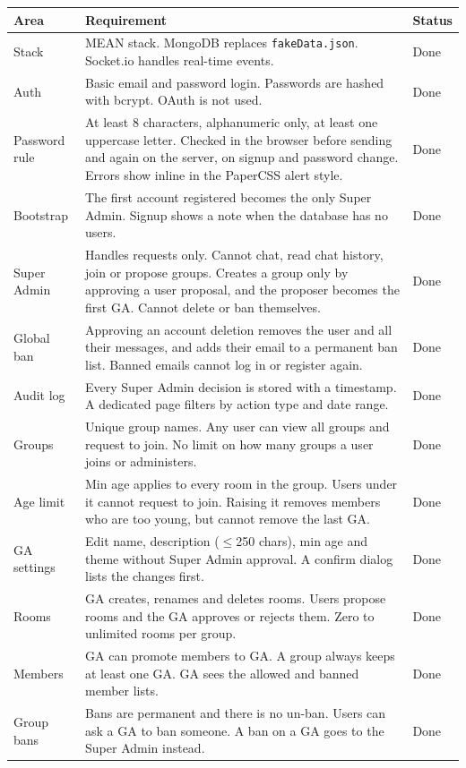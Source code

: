 \documentclass[10pt,a4paper]{article}
\newcommand{\ep}[1]{\texttt{\small #1}}
\begin{document}
\begin{longtable}{L{2.6cm} L{11.2cm} L{1.9cm}}
\toprule
\textbf{Area} & \textbf{Requirement} & \textbf{Status}\\
\midrule
\endhead
Stack & MEAN stack. MongoDB replaces \ep{fakeData.json}. Socket.io handles real-time events. & Done\\
Auth & Basic email and password login. Passwords are hashed with bcrypt. OAuth is not used. & Done\\
Password rule & At least 8 characters, alphanumeric only, at least one uppercase letter. Checked in the browser before sending and again on the server, on signup and password change. Errors show inline in the PaperCSS alert style. & Done\\
Bootstrap & The first account registered becomes the only Super Admin. Signup shows a note when the database has no users. & Done\\
Super Admin & Handles requests only. Cannot chat, read chat history, join or propose groups. Creates a group only by approving a user proposal, and the proposer becomes the first GA. Cannot delete or ban themselves. & Done\\
Global ban & Approving an account deletion removes the user and all their messages, and adds their email to a permanent ban list. Banned emails cannot log in or register again. & Done\\
Audit log & Every Super Admin decision is stored with a timestamp. A dedicated page filters by action type and date range. & Done\\
Groups & Unique group names. Any user can view all groups and request to join. No limit on how many groups a user joins or administers. & Done\\
Age limit & Min age applies to every room in the group. Users under it cannot request to join. Raising it removes members who are too young, but cannot remove the last GA. & Done\\
GA settings & Edit name, description ($\le$250 chars), min age and theme without Super Admin approval. A confirm dialog lists the changes first. & Done\\
Rooms & GA creates, renames and deletes rooms. Users propose rooms and the GA approves or rejects them. Zero to unlimited rooms per group. & Done\\
Members & GA can promote members to GA. A group always keeps at least one GA. GA sees the allowed and banned member lists. & Done\\
Group bans & Bans are permanent and there is no un-ban. Users can ask a GA to ban someone. A ban on a GA goes to the Super Admin instead. & Done\\

\end{longtable}
\end{document}
